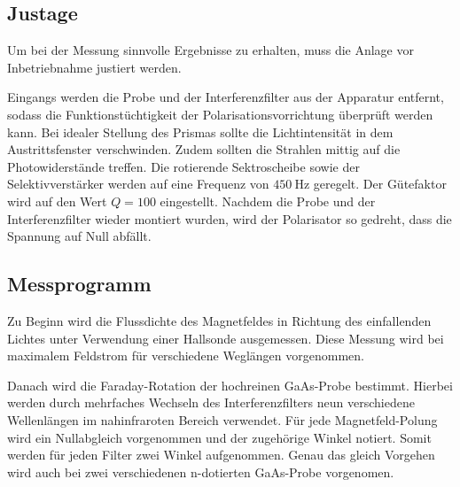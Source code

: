 \subsection{Justage}
Um bei der Messung sinnvolle Ergebnisse zu erhalten, muss die Anlage vor Inbetriebnahme justiert werden. 

\noindent
Eingangs werden die Probe und der Interferenzfilter aus der Apparatur entfernt, sodass die Funktionstüchtigkeit der
Polarisationsvorrichtung überprüft werden kann. Bei idealer Stellung des Prismas sollte die Lichtintensität in dem 
Austrittsfenster verschwinden. Zudem sollten die Strahlen mittig auf die Photowiderstände treffen. 
Die rotierende Sektroscheibe sowie der Selektivverstärker werden auf eine Frequenz von $\SI{450}{\hertz}$ geregelt. 
Der Gütefaktor wird auf den Wert $Q=\num{100}$ eingestellt. 
Nachdem die Probe und der Interferenzfilter wieder montiert wurden, wird der Polarisator so gedreht, dass die Spannung auf Null
abfällt. 

\subsection{Messprogramm}
Zu Beginn wird die Flussdichte des Magnetfeldes in Richtung des einfallenden Lichtes unter Verwendung einer Hallsonde ausgemessen.
Diese Messung wird bei maximalem Feldstrom für verschiedene Weglängen vorgenommen.

\noindent
Danach wird die Faraday-Rotation der hochreinen GaAs-Probe bestimmt. Hierbei werden durch mehrfaches Wechseln des Interferenzfilters 
neun verschiedene Wellenlängen im nahinfraroten Bereich verwendet. Für jede Magnetfeld-Polung wird ein Nullabgleich vorgenommen 
und der zugehörige Winkel notiert. Somit werden für jeden Filter zwei Winkel aufgenommen. Genau das gleich Vorgehen wird auch bei 
zwei verschiedenen n-dotierten GaAs-Probe vorgenomen. 
